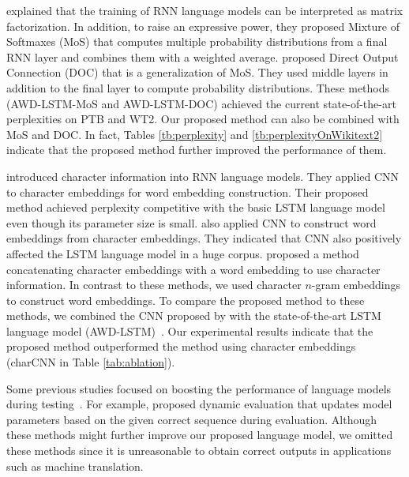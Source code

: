 \documentclass[letterpaper]{article} %
\begin{document}
\cite{DBLP:journals/corr/abs-1711-03953} explained that the training of RNN language models can be interpreted as matrix factorization.
In addition, to raise an expressive power, they proposed Mixture of Softmaxes (MoS) that computes multiple probability distributions from a final RNN layer and combines them with a weighted average.
\cite{D18-1489} proposed Direct Output Connection (DOC) that is a generalization of MoS.
They used middle layers in addition to the final layer to compute probability distributions.
These methods (AWD-LSTM-MoS and AWD-LSTM-DOC) achieved the current state-of-the-art perplexities on PTB and WT2.
Our proposed method can also be combined with MoS and DOC.
In fact, Tables \ref{tb:perplexity} and \ref{tb:perplexityOnWikitext2} indicate that the proposed method further improved the performance of them.



\cite{Kim:2016:CNL:3016100.3016285} introduced character information into RNN language models.
They applied CNN to character embeddings for word embedding construction.
Their proposed method achieved perplexity competitive with the basic LSTM language model~\cite{DBLP:journals/corr/ZarembaSV14} even though its parameter size is small.
\cite{45446} also applied CNN to construct word embeddings from character embeddings.
They indicated that CNN also positively affected the LSTM language model in a huge corpus.
\cite{verwimp-EtAl:2017:EACLlong} proposed a method concatenating character embeddings with a word embedding to use character information.
In contrast to these methods, we used character $n$-gram embeddings to construct word embeddings.
To compare the proposed method to these methods, we combined the CNN proposed by \cite{Kim:2016:CNL:3016100.3016285} with the state-of-the-art LSTM language model (AWD-LSTM)~\cite{merityRegOpt}.
Our experimental results indicate that the proposed method outperformed the method using character embeddings (charCNN in Table \ref{tab:ablation}).

Some previous studies focused on boosting the performance of language models during testing~\cite{DBLP:journals/corr/GraveJU16,DBLP:journals/corr/abs-1709-07432}.
For example, \cite{DBLP:journals/corr/abs-1709-07432} proposed dynamic evaluation that updates model parameters based on the given correct sequence during evaluation.
Although these methods might further improve our proposed language model, we omitted these methods since it is unreasonable to obtain correct outputs in applications such as machine translation.
\end{document}
